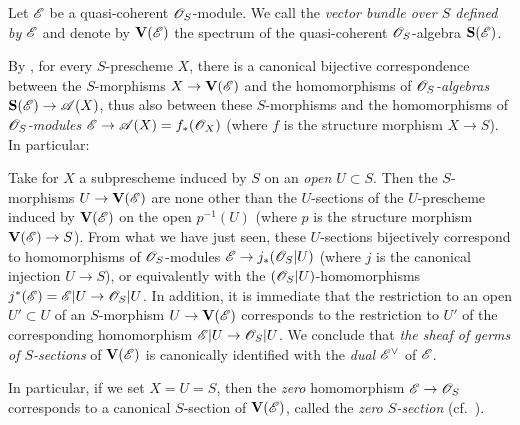 \begin{definition}[1.7.8]
\label{II.1.7.8}
Let $\mathscr{E}$ be a quasi-coherent $\mathscr{O}_S$-module.
We call the \emph{vector bundle over $S$ defined by $\mathscr{E}$} and denote by $\mathbf{V}(\mathscr{E})$ the spectrum  of the quasi-coherent $\mathscr{O}_S$-algebra $\mathbf{S}(\mathscr{E})$.
\end{definition}

By , for every $S$-prescheme $X$, there is a canonical bijective correspondence between the $S$-morphisms $X\to\bb{V}(\sh{E})$ and the homomorphisms of \emph{$\mathscr{O}_S$-algebras $\bb{S}(\sh{E})\to\sh{A}(X)$}, thus also between these $S$-morphisms and the homomorphisms of \emph{$\mathscr{O}_S$-modules $\sh{E}\to\sh{A}(X)=f_*(\sh{O}_X)$} (where $f$ is the structure morphism $X\to S$).
In particular:
\begin{env}[1.7.9]
\label{II.1.7.9}
Take for $X$ a subprescheme induced by $S$ on an \emph{open $U\subset S$}.
Then the $S$-morphisms $U\to\bb{V}(\sh{E})$ are none other than the $U$-sections  of the $U$-prescheme induced by $\mathbf{V}(\mathscr{E})$ on the open $p^{-1}(U)$ (where $p$ is the structure morphism $\bb{V}(\sh{E})\to S$).
From what we have just seen, these $U$-sections bijectively correspond to homomorphisms of $\mathscr{O}_S$-modules $\sh{E}\to j_*(\sh{O}_S|U)$ (where $j$ is the canonical injection $U\to S$), or
equivalently  with the $(\mathscr{O}_S|U)$-homomorphisms $j^*(\sh{E})=\sh{E}|U\to\sh{O}_S|U$.
In addition, it is immediate that the restriction to an open $U'\subset U$ of an $S$-morphism $U\to\bb{V}(\sh{E})$ corresponds to the restriction to $U'$ of the corresponding homomorphism $\sh{E}|U\to\sh{O}_S|U$.
We conclude that \emph{the sheaf of germs of $S$-sections} of $\mathbf{V}(\mathscr{E})$ is canonically identified with the \emph{dual ${\mathscr{E}}^\vee$} of $\mathscr{E}$.

In particular, if we set $X=U=S$, then the \emph{zero} homomorphism $\sh{E}\to\sh{O}_S$ corresponds to a canonical $S$-section of $\mathbf{V}(\mathscr{E})$, called the \emph{zero $S$-section} (cf.~).
\end{env}

